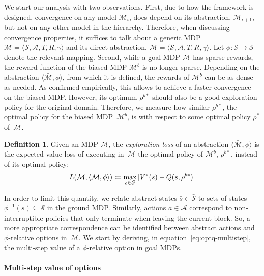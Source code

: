 \documentclass[letterpaper]{article} %
\theoremstyle{plain}
\theoremstyle{definition}
\newtheorem{definition}{Definition}
\theoremstyle{remark}
\DeclarePairedDelimiter{\abs}{\lvert}{\rvert}
\newcommand{\SetSym}[1]{\mathcal{#1}}
\newcommand{\Policy}{\rho}
\newcommand{\States}{\SetSym{S}}
\newcommand{\Actions}{\SetSym{A}}
\newcommand{\Model}{\SetSym{M}}
\newcommand{\Mapping}{\phi}
\newcommand{\Biased}[1]{#1^{b}}
\newcommand{\BiasedStar}[1]{#1^{b*}}
\newcommand{\Abst}[1]{\bar{#1}}
\begin{document}
We start our analysis with two observations.
First, due to how the framework is designed, convergence on any model $\Model_i$, does depend on its abstraction, $\Model_{i+1}$, but not on any other model in the hierarchy.
Therefore, when discussing convergence properties, it suffices to talk about a generic MDP $\Model = \langle \States, \Actions, T, R, \gamma \rangle$ and its direct abstraction, $\Abst{\Model} = \langle \Abst{\States}, \Abst{\Actions}, \Abst{T}, \Abst{R}, \Abst{\gamma} \rangle$.
Let $\Mapping: \States \to \Abst{\States}$ denote the relevant mapping.
Second, while a goal MDP $\Model$ has sparse rewards, the reward function of the biased MDP $\Biased\Model$ is no longer sparse.
Depending on the abstraction $\langle \Abst\Model, \Mapping \rangle$, from which it is defined, the rewards of $\Biased\Model$ can be as dense as needed.
As confirmed empirically, this allows to achieve a faster convergence on the biased MDP.
However, its optimum $\BiasedStar\Policy$ should also be a good exploration policy for the original domain.
Therefore, we measure how similar $\BiasedStar{\Policy}$, the optimal policy for the biased MDP~$\Biased\Model$, is with respect to some optimal policy $\Policy^*$ of~$\Model$.

\begin{definition}
Given an MDP $\Model$, the \emph{exploration loss} of an abstraction $\langle \Abst\Model, \Mapping \rangle$ is the expected value loss of executing in~$\Model$ the optimal policy of $\Biased\Model$, $\BiasedStar\Policy$, instead of its optimal policy:
\begin{equation}
L(\Model, \langle \Abst\Model, \Mapping \rangle) \coloneqq \max_{s \in \States}\,
\abs{V^*(s) - Q(s, \BiasedStar\Policy)}
\end{equation}
\label{def:exploration-loss}
\end{definition}

In order to limit this quantity, we relate abstract states $\Abst{s} \in \Abst{\States}$ to sets of states $\Mapping^{-1}(\Abst{s}) \subseteq \States$ in the ground MDP.
Similarly, actions $\Abst{a} \in \Abst\Actions$ correspond to non-interruptible policies that only terminate when leaving the current block.
So, a more appropriate correspondence can be identified between abstract actions and $\Mapping$-relative {options} in~$\Model$.
We start by deriving, in equation~\eqref{eq:optq-multistep}, the multi-step value of a $\Mapping$-relative option in goal MDPs.


\paragraph{Multi-step value of options}
\end{document}
